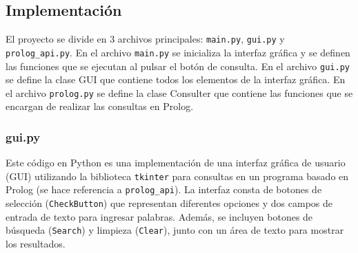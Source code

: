 \documentclass[12pt]{article}
\begin{document}
\subsection{Implementación}

El proyecto se divide en 3 archivos principales: \texttt{main.py}, \texttt{gui.py} y \texttt{prolog\_api.py}. En el archivo \texttt{main.py} se inicializa la interfaz gráfica y se definen las funciones que se ejecutan al pulsar el botón de consulta. En el archivo \texttt{gui.py} se define la clase GUI que contiene todos los elementos de la interfaz gráfica. En el archivo \texttt{prolog.py} se define la clase Consulter que contiene las funciones que se encargan de realizar las consultas en Prolog.

\subsubsection{gui.py}

Este código en Python es una implementación de una interfaz gráfica de usuario (GUI) utilizando la biblioteca \texttt{tkinter} para consultas en un programa basado en Prolog (se hace referencia a \texttt{prolog\_api}). La interfaz consta de botones de selección (\texttt{CheckButton}) que representan diferentes opciones y dos campos de entrada de texto para ingresar palabras. Además, se incluyen botones de búsqueda (\texttt{Search}) y limpieza (\texttt{Clear}), junto con un área de texto para mostrar los resultados.
\end{document}
